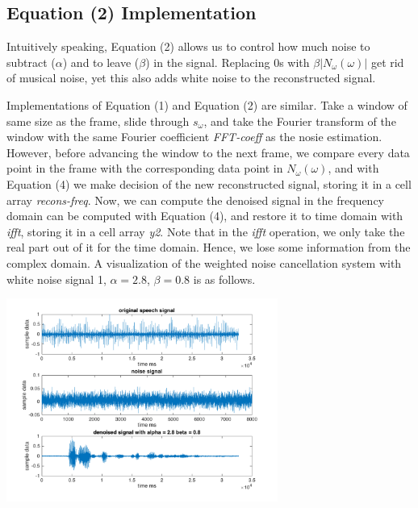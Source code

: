 \documentclass[journal]{IEEEtran}
\begin{document}
\subsection{Equation (2) Implementation}
\begin{flushleft}
Intuitively speaking, Equation (2) allows us to control how much noise to subtract ($\alpha$) and to leave ($\beta$) in the signal. Replacing 0s with $\beta|N_\omega(\omega)|$ get rid of musical noise, yet this also adds white noise to the reconstructed signal. 
\end{flushleft}

\begin{flushleft}
Implementations of Equation (1) and Equation (2) are similar. Take a window of same size as the frame, slide through $s_\omega$, and take the Fourier transform of the window with the same Fourier coefficient \textit{FFT-coeff} as the nosie estimation. However, before advancing the window to the next frame, we compare every data point in the frame with the corresponding data point in $N_\omega(\omega)$, and with Equation (4) we make decision of the new reconstructed signal, storing it in a cell array \textit{recons-freq}. Now, we can compute the denoised signal in the frequency domain can be computed with Equation (4), and restore it to time domain with \textit{ifft}, storing it in a cell array \textit{y2}. Note that in the \textit{ifft} operation, we only take the real part out of it for the time domain. Hence, we lose some information from the complex domain. A visualization of the weighted noise cancellation system with white noise signal 1, $\alpha = 2.8$, $\beta = 0.8$ is as follows. 
\end{flushleft}
\centering 
\includegraphics[width=3.5in]{plot2}
\end{document}
